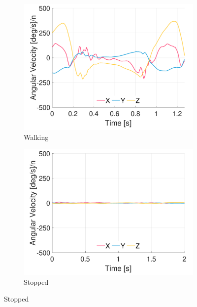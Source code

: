 \begin{figure}[p]
\centering
    \begin{subfigure}[b]{0.49\textwidth}
         \centering
         \includegraphics[width=\textwidth]{content/3-Methods/example-data/ch3_example_data_subject_01_l_ankle_gyro_activity_walking.pdf}
         \caption{Walking}
    \end{subfigure}
    \begin{subfigure}[b]{0.49\textwidth}
         \centering
         \includegraphics[width=\textwidth]{content/3-Methods/example-data/ch3_example_data_subject_01_l_ankle_gyro_activity_stop.pdf}
         \caption{Stopped}
    \end{subfigure}
    

\end{figure}
